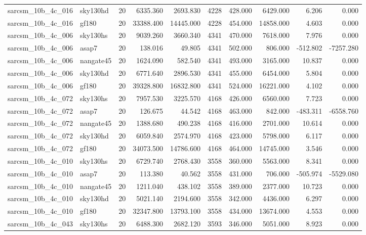 \begin{tabular}{llrrrrrrrr}
sarcsm\_10b\_4c\_016 & sky130hd & 20 & 6335.360 & 2693.830 & 4228 & 428.000 & 6429.000 & 6.206 & 0.000 \\
sarcsm\_10b\_4c\_016 & gf180 & 20 & 33388.400 & 14445.000 & 4228 & 454.000 & 14858.000 & 4.603 & 0.000 \\
sarcsm\_10b\_4c\_006 & sky130hs & 20 & 9039.260 & 3660.340 & 4341 & 470.000 & 7618.000 & 7.976 & 0.000 \\
sarcsm\_10b\_4c\_006 & asap7 & 20 & 138.016 & 49.805 & 4341 & 502.000 & 806.000 & -512.802 & -7257.280 \\
sarcsm\_10b\_4c\_006 & nangate45 & 20 & 1624.090 & 582.540 & 4341 & 493.000 & 3165.000 & 10.837 & 0.000 \\
sarcsm\_10b\_4c\_006 & sky130hd & 20 & 6771.640 & 2896.530 & 4341 & 455.000 & 6454.000 & 5.804 & 0.000 \\
sarcsm\_10b\_4c\_006 & gf180 & 20 & 39328.800 & 16832.800 & 4341 & 524.000 & 16221.000 & 4.102 & 0.000 \\
sarcsm\_10b\_4c\_072 & sky130hs & 20 & 7957.530 & 3225.570 & 4168 & 426.000 & 6560.000 & 7.723 & 0.000 \\
sarcsm\_10b\_4c\_072 & asap7 & 20 & 126.675 & 44.542 & 4168 & 463.000 & 842.000 & -483.311 & -6558.760 \\
sarcsm\_10b\_4c\_072 & nangate45 & 20 & 1388.680 & 490.238 & 4168 & 416.000 & 2701.000 & 10.614 & 0.000 \\
sarcsm\_10b\_4c\_072 & sky130hd & 20 & 6059.840 & 2574.970 & 4168 & 423.000 & 5798.000 & 6.117 & 0.000 \\
sarcsm\_10b\_4c\_072 & gf180 & 20 & 34073.500 & 14786.600 & 4168 & 464.000 & 14745.000 & 3.546 & 0.000 \\
sarcsm\_10b\_4c\_010 & sky130hs & 20 & 6729.740 & 2768.430 & 3558 & 360.000 & 5563.000 & 8.341 & 0.000 \\
sarcsm\_10b\_4c\_010 & asap7 & 20 & 113.380 & 40.562 & 3558 & 431.000 & 706.000 & -505.974 & -5529.080 \\
sarcsm\_10b\_4c\_010 & nangate45 & 20 & 1211.040 & 438.102 & 3558 & 389.000 & 2377.000 & 10.723 & 0.000 \\
sarcsm\_10b\_4c\_010 & sky130hd & 20 & 5021.140 & 2194.600 & 3558 & 342.000 & 4436.000 & 6.297 & 0.000 \\
sarcsm\_10b\_4c\_010 & gf180 & 20 & 32347.800 & 13793.100 & 3558 & 434.000 & 13674.000 & 4.553 & 0.000 \\
sarcsm\_10b\_4c\_043 & sky130hs & 20 & 6488.300 & 2682.120 & 3593 & 346.000 & 5051.000 & 8.923 & 0.000 \\

\end{tabular}
